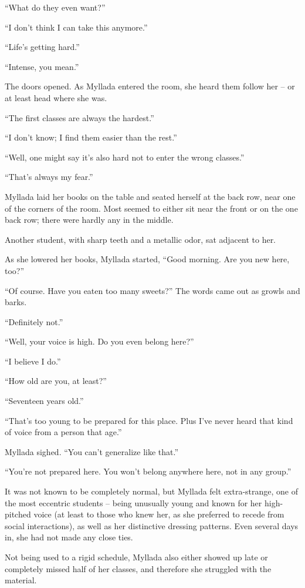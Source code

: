 ``What do they even want?''

``I don't think I can take this anymore.''

``Life's getting hard.''

``Intense, you mean.''

The doors opened. As Myllada entered the room, she heard them follow her -- or at least head where she was.

``The first classes are always the hardest.''

``I don't know; I find them easier than the rest.''

``Well, one might say it's also hard not to enter the wrong classes.''

``That's always my fear.''

Myllada laid her books on the table and seated herself at the back row, near one of the corners of the room. Most seemed to either sit near the front or on the one back row; there were hardly any in the middle.

Another student, with sharp teeth and a metallic odor, sat adjacent to her.

As she lowered her books, Myllada started, ``Good morning. Are you new here, too?''

``Of course. Have you eaten too many sweets?'' The words came out as growls and barks.

``Definitely not.''

``Well, your voice is high. Do you even belong here?''

``I believe I do.''

``How old are you, at least?''

``Seventeen years old.''

``That's too young to be prepared for this place. Plus I've never heard that kind of voice from a person that age.''

Myllada sighed. ``You can't generalize like that.''

``You're not prepared here. You won't belong anywhere here, not in any group.''

\centeredstars

It was not known to be completely normal, but Myllada felt extra-strange, one of the most eccentric students -- being unusually young and known for her high-pitched voice (at least to those who knew her, as she preferred to recede from social interactions), as well as her distinctive dressing patterns. Even several days in, she had not made any close ties.

Not being used to a rigid schedule, Myllada also either showed up late or completely missed half of her classes, and therefore she struggled with the material.

